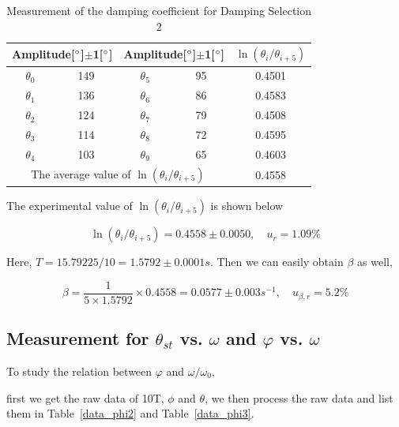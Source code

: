 \begin{table}[H] 
\centering

\begin{tabular}{|c|c|c|c|c|}
\hline

\multicolumn{2}{|c}{Amplitude[$^\circ$]$\pm$1[$^\circ$]} & 
\multicolumn{2}{|c|}{Amplitude[$^\circ$]$\pm$1[$^\circ$]} &
$\ln(\theta_i/\theta_{i+5})$\\\hline

$\theta_0$ & 149 & $\theta_5$ & 95 & 0.4501 \\\hline
$\theta_1$ & 136 & $\theta_6$ & 86 & 0.4583 \\\hline
$\theta_2$ & 124 & $\theta_7$ & 79 & 0.4508 \\\hline
$\theta_3$ & 114 & $\theta_8$ & 72 & 0.4595 \\\hline
$\theta_4$ & 103 & $\theta_9$ & 65 & 0.4603 \\\hline
\multicolumn{4}{|c|}{The average value of $\ln(\theta_i/\theta_{i+5})$}
    & 0.4558 \\\hline 
\end{tabular}

\caption{Measurement of the damping coefficient for Damping Selection 2}
\label{data_damping}
\end{table}

The experimental value of $\ln(\theta_i/\theta_{i+5})$ is shown below

\[
\ln(\theta_i/\theta_{i+5})= 0.4558 \pm 0.0050 , \quad u_r=1.09\%
\]

Here, $T= 15.79225 /10= 1.5792 \pm 0.0001s$. Then we can easily obtain $\beta$
as well, 

\[
\beta=\frac{1}{5\times1.5792}\times0.4558=  0.0577 \pm 0.003s^{-1}, \quad
u_{\beta,r}=5.2\% 
\]

\subsection{Measurement for $\theta_{st}$ vs. $\omega$ and $\varphi$ vs. 
  $\omega$} 

To study the relation between $\varphi$ and $\omega/\omega_0$, 

first we get the raw data of 10T, $\phi$ and $\theta$,
we then process the raw data and list them in Table~\ref{data_phi2} and
Table~\ref{data_phi3}. 


